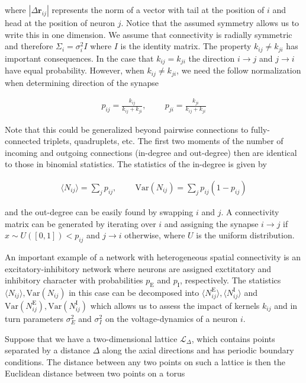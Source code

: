 \documentclass{ucetd}
\begin{document}
where $|\Delta\mathbf{r}_{ij}|$ represents the norm of a vector with tail at the position of $i$ and head at the position of neuron $j$. Notice that the assumed symmetry allows us to write this in one dimension. We assume that connectivity is radially symmetric and therefore $\Sigma_{i} = \sigma_{i}^{2}I$ where $I$ is the identity matrix. The property $k_{ij} \neq k_{ji}$ has important consequences. In the case that $k_{ij} = k_{ji}$ the direction $i\rightarrow j$ and $j\rightarrow i$ have equal probability. However, when $k_{ij} \neq k_{ji}$, we need the follow normalization when determining direction of the synapse

\begin{align*}
p_{ij} = \frac{k_{ij}}{k_{ij} + k_{ji}},\;\;\;\;\;\;\;\; p_{ji} = \frac{k_{ji}}{k_{ij} + k_{ji}}
\end{align*}

Note that this could be generalized beyond pairwise connections to fully-connected triplets, quadruplets, etc. The first two moments of  the number of incoming and outgoing connections (in-degree and out-degree) then are identical to those in binomial statistics. The statistics of the in-degree is given by

\begin{align*}
\langle N_{ij} \rangle = \sum_{j} p_{ij},\;\;\;\;\;\;\;\; \mathrm{Var}(N_{ij}) = \sum_{j} p_{ij}(1-p_{ij})
\end{align*}

and the out-degree can be easily found by swapping $i$ and $j$. A connectivity matrix can be generated by iterating over $i$ and assigning the synapse $i\rightarrow j$ if $x\sim U([0,1]) < p_{ij}$ and $j\rightarrow i$ otherwise, where $U$ is the uniform distribution. 

An important example of a network with heterogeneous spatial connectivity is an excitatory-inhibitory network where neurons are assigned exctitatory and inhibitory character with probabilities $p_{\mathrm{E}}$ and $p_{\mathrm{I}}$, respectively. The statistics $\langle N_{ij}\rangle, \mathrm{Var}(N_{ij})$ in this case can be decomposed into $\langle N_{ij}^{\mathrm{E}}\rangle, \langle N_{ij}^{\mathrm{I}}\rangle$ and $\mathrm{Var}(N_{ij}^{\mathrm{E}}), \mathrm{Var}(N_{ij}^{\mathrm{I}})$ which allows us to assess the impact of kernels $k_{ij}$ and in turn parameters $\sigma_{E}^{2}$ and $\sigma_{I}^{2}$ on the voltage-dynamics of a neuron $i$.

Suppose that we have a two-dimensional lattice $\mathcal{L}_{\Delta}$, which contains points separated by a distance $\Delta$ along the axial directions and has periodic boundary conditions. The distance between any two points on such a lattice is then the Euclidean distance between two points on a torus
\end{document}
